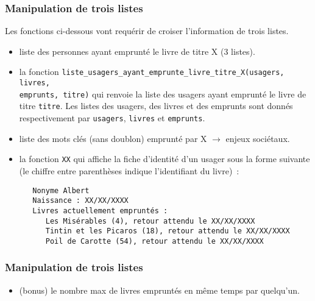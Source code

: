 \documentclass[10pt,a4paper]{sujets-exercices}
\begin{document}
\subsubsection{Manipulation de trois listes}

Les fonctions ci-dessous vont requérir de croiser l'information de trois listes.

\begin{itemize}

\item liste des personnes ayant emprunté le livre de titre X (3 listes).

\item la fonction \texttt{liste\_usagers\_ayant\_emprunte\_livre\_titre\_X(usagers, livres,\\ emprunts, titre)} qui renvoie la liste des usagers ayant emprunté le livre de titre \texttt{titre}. Les listes des usagers, des livres et des emprunts sont donnés respectivement par \texttt{usagers}, \texttt{livres} et \texttt{emprunts}.

\item liste des mots clés (sans doublon) emprunté par X $\rightarrow$ enjeux sociétaux.

\item la fonction \texttt{XX} qui affiche la fiche d'identité d'un usager sous la forme suivante (le chiffre entre parenthèses indique l'identifiant du livre)~:\\
\begin{verbatim}
   Nonyme Albert
   Naissance : XX/XX/XXXX
   Livres actuellement empruntés :
      Les Misérables (4), retour attendu le XX/XX/XXXX
      Tintin et les Picaros (18), retour attendu le XX/XX/XXXX
      Poil de Carotte (54), retour attendu le XX/XX/XXXX
\end{verbatim}



\end{itemize}


\subsubsection{Manipulation de trois listes}

\begin{itemize}

\item (bonus) le nombre max de livres empruntés en même temps par quelqu'un.

\end{itemize}
\end{document}
